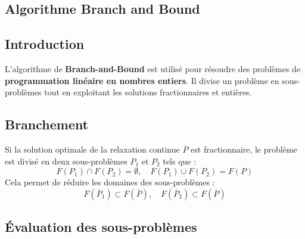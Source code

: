 \documentclass{report}
\begin{document}
\begin{multicols*}{2}

\chapter{Algorithme Branch and Bound}

\section{Introduction}

L'algorithme de \textbf{Branch-and-Bound} est utilisé pour résoudre des 
problèmes de \textbf{programmation linéaire en nombres entiers}. Il divise un 
problème en sous-problèmes tout en exploitant les solutions fractionnaires et 
entières.

\section{Branchement}

Si la solution optimale de la relaxation continue \( \overline{P} \) est 
fractionnaire, le problème est divisé en deux sous-problèmes \( P_1 \) et 
\( P_2 \) tels que :
\[
F(P_1) \cap F(P_2) = \emptyset, \quad F(P_1) \cup F(P_2) = F(P)
\]
Cela permet de réduire les domaines des sous-problèmes :
\[
F(\overline{P}_1) \subset F(\overline{P}), \quad F(\overline{P}_2) \subset F(\overline{P})
\]

\section{Évaluation des sous-problèmes}


\end{multicols*}
\end{document}

